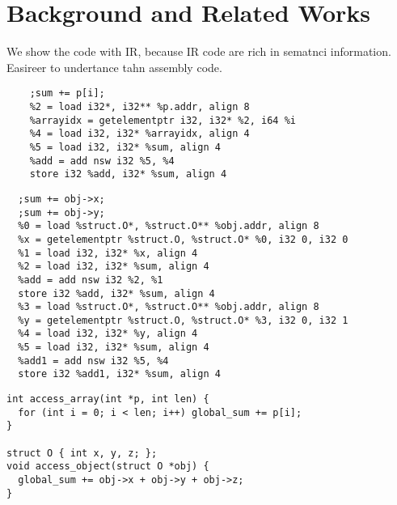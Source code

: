 \section{Background and Related Works}
We show the code with IR, because IR code are rich in sematnci information.
Easireer to undertance tahn assembly code.


\begin{verbatim}
    ;sum += p[i];
    %2 = load i32*, i32** %p.addr, align 8
    %arrayidx = getelementptr i32, i32* %2, i64 %i
    %4 = load i32, i32* %arrayidx, align 4
    %5 = load i32, i32* %sum, align 4
    %add = add nsw i32 %5, %4
    store i32 %add, i32* %sum, align 4
\end{verbatim}


\begin{verbatim}
  ;sum += obj->x;
  ;sum += obj->y;
  %0 = load %struct.O*, %struct.O** %obj.addr, align 8
  %x = getelementptr %struct.O, %struct.O* %0, i32 0, i32 0
  %1 = load i32, i32* %x, align 4
  %2 = load i32, i32* %sum, align 4
  %add = add nsw i32 %2, %1
  store i32 %add, i32* %sum, align 4
  %3 = load %struct.O*, %struct.O** %obj.addr, align 8
  %y = getelementptr %struct.O, %struct.O* %3, i32 0, i32 1
  %4 = load i32, i32* %y, align 4
  %5 = load i32, i32* %sum, align 4
  %add1 = add nsw i32 %5, %4
  store i32 %add1, i32* %sum, align 4
\end{verbatim}


\begin{verbatim}
int access_array(int *p, int len) {
  for (int i = 0; i < len; i++) global_sum += p[i];
}

struct O { int x, y, z; };
void access_object(struct O *obj) {
  global_sum += obj->x + obj->y + obj->z;
}
\end{verbatim}